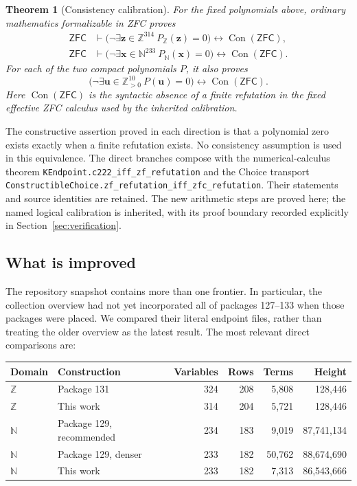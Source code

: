 \documentclass[11pt,a4paper]{article}
\newtheorem{theorem}{Theorem}[section]
\theoremstyle{remark}\newtheorem{remark}[theorem]{Remark}
\newcommand{\N}{\mathbb N}
\newcommand{\Z}{\mathbb Z}
\newcommand{\ZFC}{\mathsf{ZFC}}
\newcommand{\Con}{\operatorname{Con}}
\newcommand{\code}[1]{\nolinkurl{#1}}
\begin{document}
\begin{theorem}[Consistency calibration]\label{thm:main}
For the fixed polynomials above, ordinary mathematics formalizable in
ZFC proves
\begin{align*}
 \ZFC&\vdash
  \bigl(\neg\exists\mathbf z\in\Z^{314}\ P_{\Z}(\mathbf z)=0\bigr)
       \longleftrightarrow\Con(\ZFC),\\
 \ZFC&\vdash
  \bigl(\neg\exists\mathbf x\in\N^{233}\ P_{\N}(\mathbf x)=0\bigr)
       \longleftrightarrow\Con(\ZFC).
\end{align*}
For each of the two compact polynomials \(P\), it also proves
\[
 \bigl(\neg\exists\mathbf u\in\Z_{>0}^{10}\ P(\mathbf u)=0\bigr)
       \longleftrightarrow\Con(\ZFC).
\]
Here \(\Con(\ZFC)\) is the syntactic absence of a finite refutation in
the fixed effective ZFC calculus used by the inherited calibration.
\end{theorem}

The constructive assertion proved in each direction is that a polynomial
zero exists exactly when a finite refutation exists. No consistency
assumption is used in this equivalence. The direct branches compose
with the numerical-calculus theorem
\code{KEndpoint.c222_iff_zf_refutation} and the Choice transport
\code{ConstructibleChoice.zf_refutation_iff_zfc_refutation}.
Their statements and source identities are retained. The new arithmetic
steps are proved here; the named logical calibration is inherited, with
its proof boundary recorded explicitly in Section~\ref{sec:verification}.

\subsection{What is improved}

The repository snapshot contains more than one frontier. In particular,
the collection overview had not yet incorporated all of packages
127--133 when those packages were placed. We compared their literal
endpoint files, rather than treating the older overview as the latest
result. The most relevant direct comparisons are:

\begin{center}\small
\begin{tabular}{@{}llrrrr@{}}
\toprule
Domain & Construction & Variables & Rows & Terms & Height\\
\midrule
\(\Z\) & Package 131 &324&208&5,808&128,446\\
\(\Z\) & This work &314&204&5,721&128,446\\
\(\N\) & Package 129, recommended &234&183&9,019&87,741,134\\
\(\N\) & Package 129, denser &233&182&50,762&88,674,690\\
\(\N\) & This work &233&182&7,313&86,543,666\\
\bottomrule
\end{tabular}
\end{center}
\end{document}
